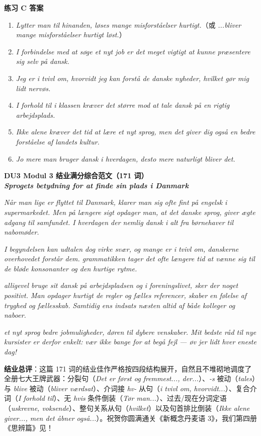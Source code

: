 \begin{answerbox}
\textbf{练习 C 答案}
\begin{enumerate}
  \item \textit{Lytter man til hinanden, løses mange misforståelser hurtigt.}（或 \textit{...bliver mange misforståelser hurtigt løst.}）
  \item \textit{I forbindelse med at søge et nyt job er det meget vigtigt at kunne præsentere sig selv på dansk.}
  \item \textit{Jeg er i tvivl om, hvorvidt jeg kan forstå de danske nyheder, hvilket gør mig lidt nervøs.}
  \item \textit{I forhold til i klassen kræver det større mod at tale dansk på en rigtig arbejdsplads.}
  \item \textit{Ikke alene kræver det tid at lære et nyt sprog, men det giver dig også en bedre forståelse af landets kultur.}
  \item \textit{Jo mere man bruger dansk i hverdagen, desto mere naturligt bliver det.}
\end{enumerate}

\textbf{DU3 Modul 3 结业满分综合范文（171 词）}\\
\textit{\textbf{Sprogets betydning for at finde sin plads i Danmark}}

\textit{Når man lige er flyttet til Danmark, klarer man sig ofte fint på engelsk i supermarkedet. Men på længere sigt opdager man, at  det danske sprog,  giver ægte adgang til samfundet. I hverdagen  der nemlig dansk i alt fra børnehaver til nabomøder.}

\textit{I begyndelsen kan udtalen dog virke svær, og mange er i tvivl om,  danskerne overhovedet forstår dem.  grammatikken tager det ofte længere tid at vænne sig til de bløde konsonanter og den hurtige rytme.}

\textit{ alligevel bruge sit dansk på arbejdspladsen og i foreningslivet, sker der noget positivt. Man opdager hurtigt de  regler og fælles referencer,  skaber en  følelse af tryghed og fællesskab. Samtidig  ens indsats næsten altid  af både kolleger og naboer.}

\textit{ et nyt sprog bedre jobmuligheder,  døren til dybere venskaber. Mit bedste råd til nye kursister er derfor enkelt: vær ikke bange for at begå fejl --- øv jer lidt hver eneste dag!}

\small\textbf{结业总评}：这篇 171 词的结业佳作严格按四段结构展开，自然且不堆砌地调度了全册七大王牌武器：分裂句（\textit{Det er først og fremmest..., der...}）、\textit{-s} 被动（\textit{tales}）与 \textit{blive} 被动（\textit{bliver værdsat}）、介词接 \textit{hv-} 从句（\textit{i tvivl om, hvorvidt...}）、复合介词（\textit{I forhold til}）、无 \textit{hvis} 条件倒装（\textit{Tør man...}）、过去/现在分词定语（\textit{uskrevne, voksende}）、整句关系从句（\textit{hvilket}）以及句首排比倒装（\textit{Ikke alene giver..., men det åbner også...}）。祝贺你圆满通关《新概念丹麦语 3》，我们第四册《思辨篇》见！
\end{answerbox}
